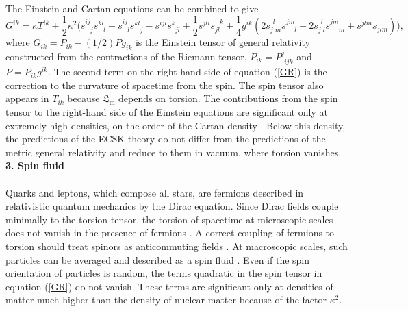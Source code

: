 \documentclass[prd,onecolumn,nofootinbib]{revtex4}
\begin{document}
The Einstein and Cartan equations can be combined to give \cite{review,Niko,HHK,Dir}
\begin{equation}
G^{ik}=\kappa T^{ik}+\frac{1}{2}\kappa^2\biggl(s^{ij}_{\phantom{ij}j}s^{kl}_{\phantom{kl}l}-s^{ij}_{\phantom{ij}l}s^{kl}_{\phantom{kl}j}-s^{ijl}s^k_{\phantom{k}jl}+\frac{1}{2}s^{jli}s_{jl}^{\phantom{jl}k}+\frac{1}{4}g^{ik}(2s^{\phantom{j}l}_{j\phantom{l}m}s^{jm}_{\phantom{jm}l}-2s^{\phantom{j}l}_{j\phantom{l}l}s^{jm}_{\phantom{jm}m}+s^{jlm}s_{jlm})\biggr),
\label{GR}
\end{equation}
where $G_{ik}=P_{ik}-(1/2)Pg_{ik}$ is the Einstein tensor of general relativity constructed from the contractions of the Riemann tensor, $P_{ik}=P^j_{\phantom{j}ijk}$ and $P=P_{ik}g^{ik}$.
The second term on the right-hand side of equation (\ref{GR}) is the correction to the curvature of spacetime from the spin.
The spin tensor also appears in $T_{ik}$ because $\mathfrak{L}_\textrm{m}$ depends on torsion.
The contributions from the spin tensor to the right-hand side of the Einstein equations are significant only at extremely high densities, on the order of the Cartan density \cite{Dir}.
Below this density, the predictions of the ECSK theory do not differ from the predictions of the metric general relativity and reduce to them in vacuum, where torsion vanishes.\\


{\bf 3. Spin fluid}\\ \\
Quarks and leptons, which compose all stars, are fermions described in relativistic quantum mechanics by the Dirac equation.
Since Dirac fields couple minimally to the torsion tensor, the torsion of spacetime at microscopic scales does not vanish in the presence of fermions \cite{ScKi,Niko,Dir}.
A correct coupling of fermions to torsion should treat spinors as anticommuting fields \cite{Cha}.
At macroscopic scales, such particles can be averaged and described as a spin fluid \cite{Niko,avert,HHK,Gas,Bre,torsion1,Kuc}.
Even if the spin orientation of particles is random, the terms quadratic in the spin tensor in equation (\ref{GR}) do not vanish.
These terms are significant only at densities of matter much higher than the density of nuclear matter because of the factor $\kappa^2$.
\end{document}
